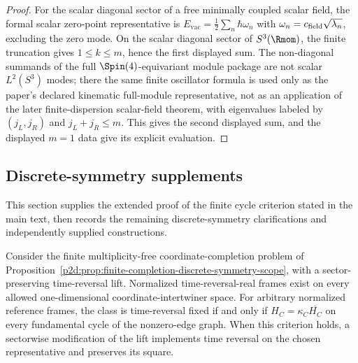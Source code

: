 \documentclass[11pt,a4paper]{article}
\begin{document}
\begin{proof}
For the scalar diagonal sector of a free minimally coupled scalar field, the formal scalar zero-point representative is
\(E_{\mathrm{vac}}=\frac12\sum_n\hbar\omega_n\) with
\(\omega_n=c_{\rm field}\sqrt{\lambda_n}\), excluding the zero mode.  On the scalar
diagonal sector of \(S^3(\Rmom)\), the finite truncation gives
\(1\le k\le m\), hence the first displayed sum.  The non-diagonal summands
of the full \(\Spin(4)\)-equivariant module package are not scalar
\(L^2(S^3)\) modes; there the same finite oscillator formula is used only as
the paper's declared kinematic full-module representative, not as an
application of the later finite-dispersion scalar-field theorem, with eigenvalues labeled by
\((j_L,j_R)\) and \(j_L+j_R\le m\).  This gives the second displayed sum,
and the displayed \(m=1\) data give its explicit evaluation.
\end{proof}







\subsection{Discrete-symmetry supplements}
\label{p2d:app:discrete-supplements}
This section supplies the extended proof of the finite cycle criterion
stated in the main text, then records the remaining discrete-symmetry
clarifications and independently supplied constructions.

\begin{lemma}
\label{p2d:lem:time-reversal-cycle-criterion}
Consider the finite multiplicity-free coordinate-completion problem of
Proposition~\ref{p2d:prop:finite-completion-discrete-symmetry-scope},
with a sector-preserving time-reversal lift.
Normalized time-reversal-real frames exist on every allowed
one-dimensional coordinate-intertwiner space.
For arbitrary normalized reference frames, the class is time-reversal fixed
if and only if \(H_C=\kappa_C\overline{H_C}\) on every fundamental cycle of
the nonzero-edge graph.
When this criterion holds, a sectorwise modification of the lift implements
time reversal on the chosen representative and preserves its square.
\end{lemma}
\end{document}
